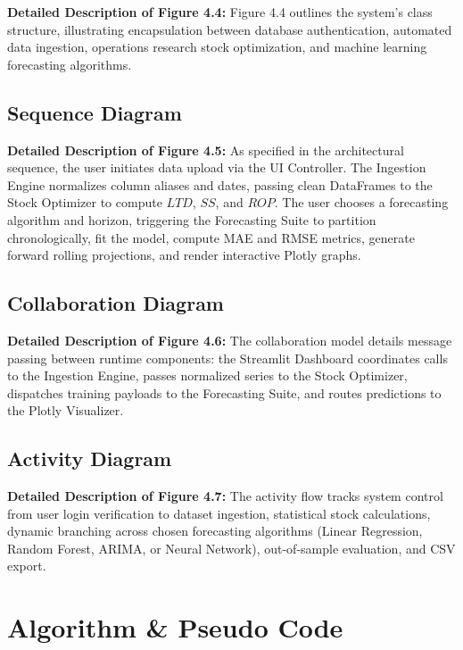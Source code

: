 \documentclass[12pt,a4paper]{report}
\begin{document}
\noindent \textbf{Detailed Description of Figure 4.4:} Figure 4.4 outlines the system's class structure, illustrating encapsulation between database authentication, automated data ingestion, operations research stock optimization, and machine learning forecasting algorithms.

\subsection{Sequence Diagram}
\noindent \textbf{Detailed Description of Figure 4.5:} As specified in the architectural sequence, the user initiates data upload via the UI Controller. The Ingestion Engine normalizes column aliases and dates, passing clean DataFrames to the Stock Optimizer to compute $LTD$, $SS$, and $ROP$. The user chooses a forecasting algorithm and horizon, triggering the Forecasting Suite to partition chronologically, fit the model, compute MAE and RMSE metrics, generate forward rolling projections, and render interactive Plotly graphs.

\subsection{Collaboration Diagram}
\noindent \textbf{Detailed Description of Figure 4.6:} The collaboration model details message passing between runtime components: the Streamlit Dashboard coordinates calls to the Ingestion Engine, passes normalized series to the Stock Optimizer, dispatches training payloads to the Forecasting Suite, and routes predictions to the Plotly Visualizer.

\subsection{Activity Diagram}
\noindent \textbf{Detailed Description of Figure 4.7:} The activity flow tracks system control from user login verification to dataset ingestion, statistical stock calculations, dynamic branching across chosen forecasting algorithms (Linear Regression, Random Forest, ARIMA, or Neural Network), out-of-sample evaluation, and CSV export.

\newpage
\section{Algorithm \& Pseudo Code}
\end{document}
